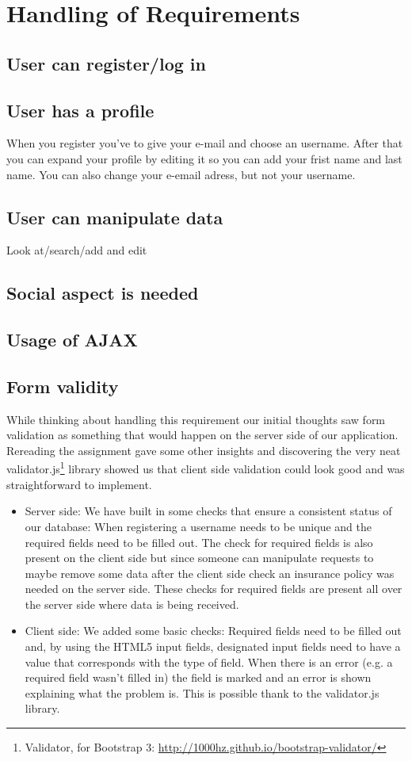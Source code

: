\documentclass{article}
\begin{document}
\section{Handling of Requirements}
\subsection{User can register/log in}

\subsection{User has a profile}
When you register you've to give your e-mail and choose an username. After that you can expand your profile by editing it so you can add your frist name and last name. You can also change your e-email adress, but not your username.
\subsection{User can manipulate data}
Look at/search/add and edit

\subsection{Social aspect is needed}

\subsection{Usage of AJAX}

\subsection{Form validity}
While thinking about handling this requirement our initial thoughts saw form validation as something that would happen on the server side of our application. Rereading the assignment gave some other insights and discovering the very neat validator.js\footnote{Validator, for Bootstrap 3: \url{http://1000hz.github.io/bootstrap-validator/} } library showed us that client side validation could look good and was straightforward to implement.
\begin{itemize}
	\item Server side: We have built in some checks that ensure a consistent status of our database: When registering a username needs to be unique and the required fields need to be filled out. The check for required fields is also present on the client side but since someone can manipulate requests to maybe remove some data after the client side check an insurance policy was needed on the server side. These checks for required fields are present all over the server side where data is being received.
	\item Client side: We added some basic checks: Required fields need to be filled out and, by using the HTML5 input fields, designated input fields need to have a value that corresponds with the type of field. When there is an error (e.g. a required field wasn't filled in) the field is marked and an error is shown explaining what the problem is. This is possible thank to the validator.js library.
\end{itemize}
\end{document}
